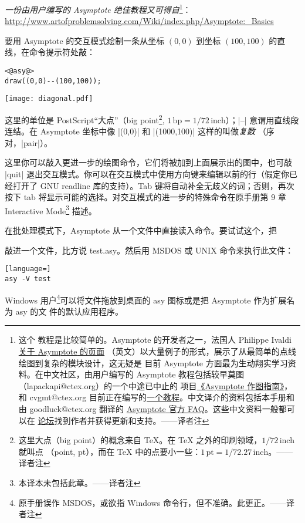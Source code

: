 \documentclass[nofonts,CJKnormalspaces]{ctexbook}[2009/05/20]
\newcommand*\prgname[1]{\textsf{#1}}
\newcommand\transnote[1]{\footnote{#1——译者注}}
\begin{document}
\emph{一份由用户编写的 \prgname{Asymptote} 绝佳教程又可得自}\transnote{这个
教程是比较简单的。\prgname{Asymptote} 的开发者之一，法国人 Philippe Ivaldi
\href{http://piprim.tuxfamily.org/asymptote/}{关于 \prgname{Asymptote} 的页面}
（英文）以大量例子的形式，展示了从最简单的点线绘图到复杂的模块设计，这无疑是
目前 \prgname{Asymptote} 方面最为生动翔实学习资料。在中文社区，由用户编写的
\prgname{Asymptote} 教程包括较早莫图（lapackapi@ctex.org）的一个中途已中止的
项目\href{http://gzmfig.googlepages.com/}{《\prgname{Asymptote} 作图指南》}，
和 cvgmt@ctex.org 目前正在编写的\href{http://code.google.com/p/asy4cn/}
{一个教程}。中文译介的资料包括本手册和由 goodluck@ctex.org 翻译的
\href{http://bbs.ctex.org/viewthread.php?tid=47344}
{\prgname{Asymptote} 官方 FAQ}。这些中文资料一般都可以在
\href{http://bbs.ctex.org}{\CTeX{} 论坛}找到作者并获得更新和支持。}：
\url{http://www.artofproblemsolving.com/Wiki/index.php/Asymptote:_Basics}

要用 \prgname{Asymptote} 的交互模式绘制一条从坐标 $(0, 0)$ 到坐标
$(100, 100)$ 的直线，在命令提示符处敲：
\begin{lstlisting}
<@asy@>
draw((0,0)--(100,100));
\end{lstlisting}
\begin{center}
  \texttt{[image: diagonal.pdf]}
\end{center}

这里的单位是 \prgname{PostScript}“大点”（big point\transnote{这里大点（big
point）的概念来自 \TeX{}。在 \TeX{} 之外的印刷领域，$1/72$\,inch 就叫点
（point, pt），而在 \TeX{} 中的点要小一些：$1\,\text{pt} = 1/72.27\,\text{inch}$。},
$1\,\text{bp} = 1/72\,\text{inch}$）；|--| 意谓用直线段连结。在
\prgname{Asymptote} 坐标中像 |(0,0)| 和 |(1000,100)| 这样的叫做\emph{复数}%
（序对，|pair|）。

这里你可以敲入更进一步的绘图命令，它们将被加到上面展示出的图中，也可敲 |quit|
退出交互模式。你可以在交互模式中使用方向键来编辑以前的行（假定你已经打开了
GNU \prgname{readline} 库的支持）。Tab 键将自动补全无歧义的词；否则，再次按下
tab 将显示可能的选择。对交互模式的进一步的特殊命令在原手册第 9 章 Interactive
Mode\transnote{本译本未包括此章。} 描述。

在批处理模式下，\prgname{Asymptote} 从一个文件中直接读入命令。要试试这个，把

敲进一个文件，比方说 \prgname{test.asy}。然后用 \prgname{MSDOS} 或
\prgname{UNIX} 命令来执行此文件：
\begin{lstlisting}[language=]
asy -V test
\end{lstlisting}
\prgname{Windows} 用户\transnote{原手册误作 \prgname{MSDOS}，或欲指
\prgname{Windows} 命令行，但不准确。此更正。}可以将文件拖放到桌面的
\prgname{asy} 图标或是把 \prgname{Asymptote} 作为扩展名为 \prgname{asy} 的文
件的默认应用程序。
\end{document}
